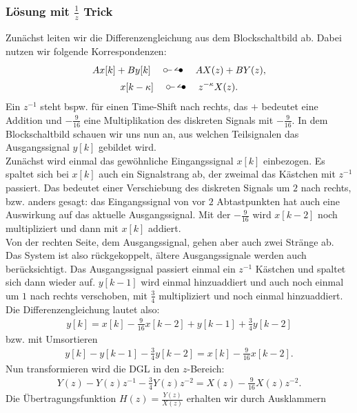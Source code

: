 \documentclass[11pt,a4paper,DIV=12]{scrartcl}
\begin{document}
\subsubsection*{Lösung mit $\frac{1}{z}$ Trick}
Zunächst leiten wir die Differenzengleichung aus dem Blockschaltbild ab.
Dabei nutzen wir folgende Korrespondenzen:
%
%
%
\begin{gather}
	Ax[k]+By[k]\quad\ztransf\quad AX(z)+BY(z),\nonumber\\
	x[k-\kappa]\quad\ztransf\quad z^{-\kappa}X(z).\nonumber
\end{gather}
%
%
%
Ein $z^{-1}$ steht bspw. für einen Time-Shift nach rechts, das $+$ bedeutet
eine Addition und $-\frac{9}{16}$ eine Multiplikation des diskreten Signals mit
$-\frac{9}{16}$.
%
In dem Blockschaltbild schauen wir uns nun an, aus welchen Teilsignalen das
Ausgangssignal $y[k]$ gebildet wird.\\
%
Zunächst wird einmal das gewöhnliche Eingangssignal $x[k]$ einbezogen.
%
Es spaltet sich bei $x[k]$ auch ein Signalstrang ab, der zweimal das Kästchen
mit $z^{-1}$ passiert. Das bedeutet einer Verschiebung des diskreten Signals um
$2$ nach rechts, bzw. anders gesagt: das Eingangssignal von vor $2$
Abtastpunkten hat auch eine Auswirkung auf das aktuelle Ausgangssignal.
%
Mit der $-\frac{9}{16}$ wird $x[k-2]$ noch multipliziert und dann mit $x[k]$
addiert.\\
%
Von der rechten Seite, dem Ausgangssignal, gehen aber auch zwei Stränge ab.
%
Das System ist also rückgekoppelt, ältere Ausgangssignale werden auch
berücksichtigt.
%
Das Ausgangssignal passiert einmal ein $z^{-1}$ Kästchen und spaltet sich dann
wieder auf.
%
$y[k-1]$ wird einmal hinzuaddiert und auch noch einmal um $1$ nach rechts
verschoben, mit $\frac{3}{4}$ multipliziert und noch einmal hinzuaddiert.
%
Die Differenzengleichung lautet also:\label{pg:DGL}
%
%
%
\begin{gather}
	y[k] = x[k] - \frac{9}{16} x[k-2] + y[k-1] + \frac{3}{4} y[k-2]
\end{gather}
%
%
%
bzw. mit Umsortieren
%
%
%
\begin{gather}
	y[k] - y[k-1] - \frac{3}{4} y[k-2] = x[k] - \frac{9}{16} x[k-2].
\end{gather}
%
%
%
Nun transformieren wird die DGL in den $z$-Bereich:
%
%
%
\begin{gather}
	Y(z) - Y(z) z^{-1} - \frac{3}{4} Y(z) z^{-2} = X(z) - \frac{9}{16} X(z) z^{-2}.
\end{gather}
%
%
%
Die Übertragungsfunktion $H(z)=\frac{Y(z)}{X(z)}$ erhalten wir durch Ausklammern
\end{document}
